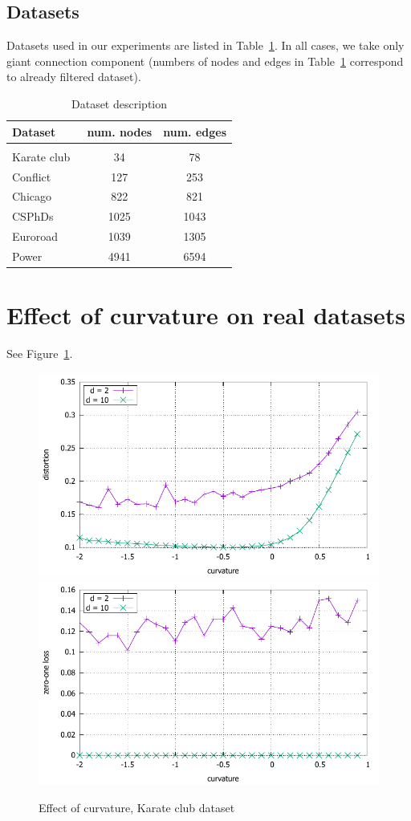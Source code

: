 \documentclass{article} %
\begin{document}
\subsection{Datasets}

Datasets used in our experiments are listed in Table~\ref{tab:datasets}. In all cases, we take only giant connection component (numbers of nodes and edges in Table~\ref{tab:datasets} correspond to already filtered dataset).

\begin{table}[t]
\caption{Dataset description}
\label{tab:datasets}
\begin{center}
\begin{tabular}{lcc}
Dataset & num. nodes & num. edges \\
 \hline \\
Karate club~\citep{zachary1977information} 
    	& 34 & 78   \\
Conflict~\citep{ward2007disputes} & 127 & 253 \\
Chicago~\citep{eash1979equilibrium} & 822 & 821 \\
CSPhDs~\citep{nooy2006exploratory} & 1025 & 1043 \\
Euroroad~\citep{vsubelj2011robust} &  1039 & 1305 \\
Power~\citep{watts1998collective} & 4941 & 6594 \\
\end{tabular}
\end{center}
\end{table}

\section{Effect of curvature on real datasets}

See Figure~\ref{fig:karate}.

\begin{figure}
    \centering
    \includegraphics[width = 0.49 \textwidth]{karate_distortion.pdf}
    \includegraphics[width = 0.49 \textwidth]{karate_zero_one.pdf}
    \caption{Effect of curvature, Karate club dataset}
    \label{fig:karate}
\end{figure}
\end{document}
